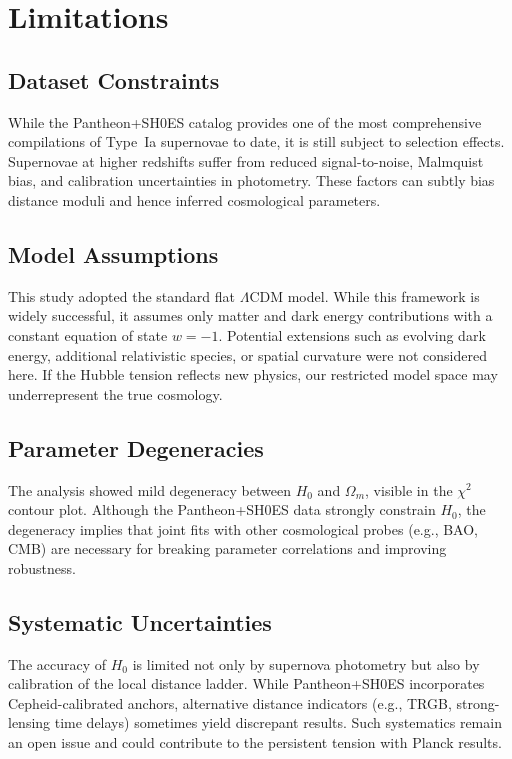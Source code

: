 \documentclass[12pt]{article}
\begin{document}
\section{Limitations}
\subsection*{Dataset Constraints}
While the Pantheon+SH0ES catalog provides one of the most comprehensive compilations of Type~Ia supernovae to date, it is still subject to selection effects. 
Supernovae at higher redshifts suffer from reduced signal-to-noise, Malmquist bias, and calibration uncertainties in photometry. These factors can subtly bias 
distance moduli and hence inferred cosmological parameters.

\subsection*{Model Assumptions}
This study adopted the standard flat $\Lambda$CDM model. While this framework is widely successful, it assumes only matter and dark energy contributions with a 
constant equation of state $w=-1$. Potential extensions such as evolving dark energy, additional relativistic species, or spatial curvature were not considered here. 
If the Hubble tension reflects new physics, our restricted model space may underrepresent the true cosmology.

\subsection*{Parameter Degeneracies}
The analysis showed mild degeneracy between $H_0$ and $\Omega_m$, visible in the $\chi^2$ contour plot. Although the Pantheon+SH0ES data strongly constrain $H_0$, 
the degeneracy implies that joint fits with other cosmological probes (e.g., BAO, CMB) are necessary for breaking parameter correlations and improving robustness.

\subsection*{Systematic Uncertainties}
The accuracy of $H_0$ is limited not only by supernova photometry but also by calibration of the local distance ladder. While Pantheon+SH0ES incorporates 
Cepheid-calibrated anchors, 
alternative distance indicators (e.g., TRGB, strong-lensing time delays) sometimes yield discrepant results. Such systematics remain an open issue and could 
contribute to the persistent tension with Planck results.
\end{document}

